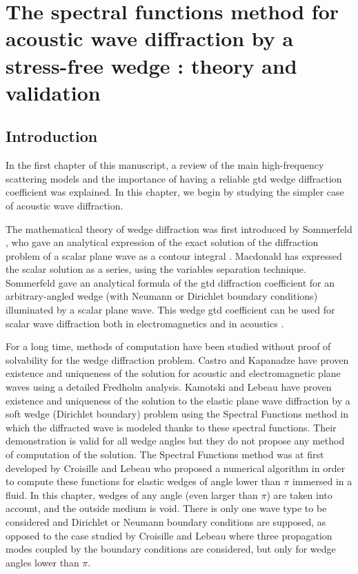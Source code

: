 \chapter[][Acoustic Case]{The spectral functions method for acoustic wave diffraction by a stress-free
wedge : theory and validation}
\label{chap-acoustic}


\section*{Introduction}
In the first chapter of this manuscript, a review of the main high-frequency scattering models and the importance of having a reliable \acrshort{gtd} wedge diffraction coefficient was explained. In this chapter, we begin by studying the simpler case of acoustic wave diffraction.

The mathematical theory of wedge diffraction was first introduced by Sommerfeld \cite{Sommerfeld}, who gave an analytical expression of the exact solution of the diffraction problem of a scalar plane wave as a contour integral \cite{SMtechnique}. Macdonald \cite{Macdo} has expressed the scalar solution as a series, using the variables separation technique. Sommerfeld \cite{Sommerfeld} gave an analytical formula of the \acrfull{gtd} diffraction coefficient for an arbitrary-angled wedge (with Neumann or Dirichlet boundary conditions) illuminated by a scalar plane wave. This wedge \acrshort{gtd} coefficient can be used for scalar wave diffraction both in electromagnetics \cite{Kouyoumjian} and in acoustics \cite{Bouche,Bo}.

For a long time, methods of computation have been studied without proof of solvability for the wedge diffraction problem. Castro and Kapanadze \cite{Castro} have proven existence and uniqueness of the solution for acoustic and electromagnetic plane waves using a detailed Fredholm analysis. Kamotski and Lebeau \cite{KamotskiLebeau} have proven existence and uniqueness of the solution to the elastic plane wave diffraction  by a soft wedge (Dirichlet boundary) problem using the Spectral Functions method in which the diffracted wave is modeled thanks to these spectral functions. Their demonstration is valid for all wedge angles but they do not propose any method of computation of the solution. The Spectral Functions method was at first developed by Croisille and Lebeau \cite{CroisilleLebeau} who proposed a numerical algorithm in order to compute these functions for elastic wedges of angle lower than $\pi$ immersed in a fluid. In this chapter, wedges of any angle (even larger than $\pi$) are taken into account, and the outside medium is void. There is only one wave type to be considered and Dirichlet or Neumann boundary conditions are supposed, as opposed to the case studied by Croisille and Lebeau \cite{CroisilleLebeau} where three propagation modes coupled by the boundary conditions are considered, but only for wedge angles lower than $\pi$.

